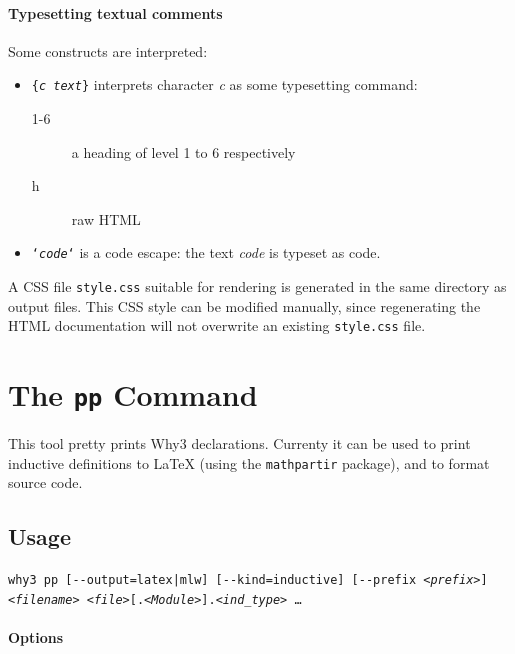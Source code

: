 \paragraph{Typesetting textual comments}

Some constructs are interpreted:
\begin{itemize}
\item \texttt{\{\textsl{c text}\}} interprets character \textsl{c} as
  some typesetting command:
  \begin{description}
  \item[1-6] a heading of level 1 to 6 respectively
  \item[h] raw HTML
  \end{description}
\item \texttt{`\textsl{code}`} is a code escape: the text
  \textsl{code} is typeset as \why code.
\end{itemize}

A CSS file \verb|style.css| suitable for rendering is generated in the
same directory as output files. This CSS style can be modified manually,
since regenerating the HTML documentation will not overwrite an existing
\verb|style.css| file.

\section{The \texttt{pp} Command}

This tool pretty prints Why3 declarations. Currenty it can be used to
print \whyml inductive definitions to \LaTeX{} (using the
\texttt{mathpartir} package), and to format \whyml source code.

\subsection*{Usage}

\texttt{why3 pp [-{}-output=latex|mlw] [-{}-kind=inductive] [-{}-prefix \textsl{<prefix>}]\\%
  \indent \textsl{<filename>} \textsl{<file>}[.\textsl{<Module>}].\textsl{<ind\_type>} \ldots}

\paragraph{Options}

